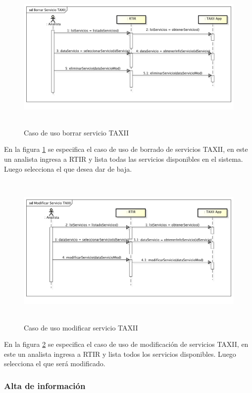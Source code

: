 \bigskip
\begin{figure}[ht!]
	\centering
	\includegraphics[width=5.7634in,height=2.898in]{Analisis22-img/Analisis22-img024.png} 
	\caption{Caso de uso borrar	servicio TAXII}
	\label{fig.borradoserviciotaxii}
\end{figure}
	En la figura \ref{fig.borradoserviciotaxii} se especifica el caso de uso de borrado de servicios TAXII, en este un analista ingresa a RTIR y lista
	todas las servicios disponibles en el sistema. Luego selecciona el que desea dar de baja.
\newpage
\begin{figure}
	\centering
	\includegraphics[width=5.7638in,height=2.9366in]{Analisis22-img/Analisis22-img025.png} 
	\caption{Caso de uso modificar servicio TAXII}
	\label{fig.modificarserviciotaxii}
\end{figure}

	En la figura \ref{fig.modificarserviciotaxii} se especifica el caso de uso de modificación de servicios TAXII, en este un analista ingresa a RTIR y
	lista todos los servicios disponibles. Luego selecciona el que será modificado.
\newpage
\subsubsection{Alta de información}

